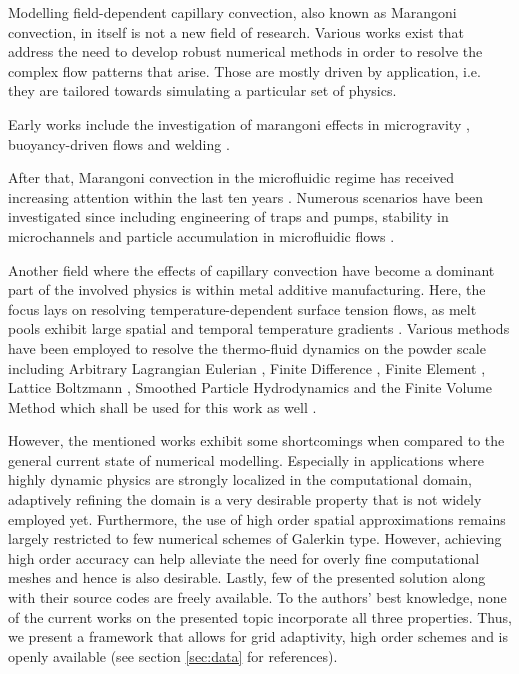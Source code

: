 \documentclass[conference,final,a4paper]{IEEEtran}
\begin{document}
Modelling field-dependent capillary convection, also known as Marangoni convection, in itself is not a new field of research.
Various works exist that address the need to develop robust numerical methods in order to resolve the complex flow patterns that arise. Those are mostly driven by application, i.e. they are tailored towards simulating a particular set of physics.

Early works include the investigation of marangoni effects in microgravity \cite{chunExperimentsTransitionSteady1979,chunMicrogravitySimulationMarangoni1978}, buoyancy-driven flows \cite{villersCoupledBuoyancyMarangoni1992} and welding \cite{limmaneevichitrExperimentsSimulateEffect2000,limmaneevichitrVisualizationMarangoniConvection2000}.

After that, Marangoni convection in the microfluidic regime has received increasing attention within the last ten years \cite{karbalaeiThermocapillarityMicrofluidicsReview2016}. Numerous scenarios have been investigated since including engineering of traps and pumps, stability in microchannels and particle accumulation in microfluidic flows \cite{panInstabilityMarangoniToroidal2011,basuVirtualMicrofluidicTraps2008,orlishausenParticleAccumulationDepletion2017}.

Another field where the effects of capillary convection have become a dominant part of the involved physics is within metal additive manufacturing. Here, the focus lays on resolving temperature-dependent surface tension flows, as melt pools exhibit large spatial and temporal temperature gradients \cite{debroyAdditiveManufacturingMetallic2018}. Various methods have been employed to resolve the thermo-fluid dynamics on the powder scale including Arbitrary Lagrangian Eulerian \cite{khairallahMesoscopicSimulationModel2014,martinDynamicsPoreFormation2019}, Finite Difference \cite{gusarovModelRadiationHeat2009}, Finite Element \cite{zhangMultiscaleMultiphysicsModeling2018,caoNovelHighefficientFinite2021}, Lattice Boltzmann \cite{krzyzanowskiMultiphysicsSimulationApproach2021}, Smoothed Particle Hydrodynamics \cite{wimmerExperimentalNumericalInvestigations2021} and the Finite Volume Method which shall be used for this work as well \cite{leeMesoscopicSimulationHeat2015,gurtlerSimulationLaserBeam2013,ottoMultiphysicalSimulationLaser2012}.

However, the mentioned works exhibit some shortcomings when compared to the general current state of numerical modelling. Especially in applications where highly dynamic physics are strongly localized in the computational domain, adaptively refining the domain is a very desirable property that is not widely employed yet. Furthermore, the use of high order spatial approximations remains largely restricted to few numerical schemes of Galerkin type. However, achieving high order accuracy can help alleviate the need for overly fine computational meshes and hence is also desirable. Lastly, few of the presented solution along with their source codes are freely available. To the authors' best knowledge, none of the current works on the presented topic incorporate all three properties. Thus, we present a framework that allows for grid adaptivity, high order schemes and is openly available (see section \ref{sec:data} for references).
\end{document}
